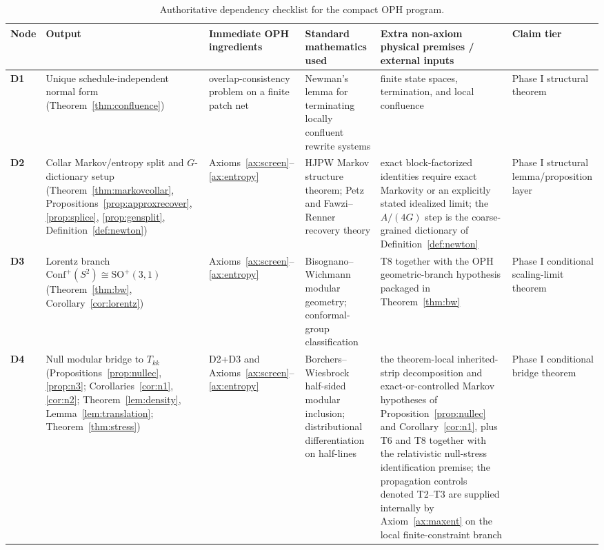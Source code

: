 \documentclass[11pt]{article}
\newcommand{\Conf}{\mathrm{Conf}}
\begin{document}
\begingroup
\scriptsize
\setlength{\tabcolsep}{2pt}
\begin{longtable}{@{}>{\raggedright\arraybackslash}p{}>{\raggedright\arraybackslash}p{}>{\raggedright\arraybackslash}p{}>{\raggedright\arraybackslash}p{}>{\raggedright\arraybackslash}p{}>{\raggedright\arraybackslash}p{}@{}}
\caption{Authoritative dependency checklist for the compact OPH program.}\\
\toprule
Node & Output & Immediate OPH ingredients & Standard mathematics used & Extra non-axiom physical premises / external inputs & Claim tier \\
\midrule
\endhead
\bottomrule
\endfoot
\textbf{D1} & Unique schedule-independent normal form (Theorem~\ref{thm:confluence}) & overlap-consistency problem on a finite patch net & Newman's lemma for terminating locally confluent rewrite systems & finite state spaces, termination, and local confluence & Phase I structural theorem \\
\textbf{D2} & Collar Markov/entropy split and \(G\)-dictionary setup (Theorem~\ref{thm:markovcollar}, Propositions~\ref{prop:approxrecover}, \ref{prop:splice}, \ref{prop:gensplit}, Definition~\ref{def:newton}) & Axioms~\ref{ax:screen}--\ref{ax:entropy} & HJPW Markov structure theorem; Petz and Fawzi--Renner recovery theory & exact block-factorized identities require exact Markovity or an explicitly stated idealized limit; the \(A/(4G)\) step is the coarse-grained dictionary of Definition~\ref{def:newton} & Phase I structural lemma/proposition layer \\
\textbf{D3} & Lorentz branch \(\Conf^+(S^2)\cong \mathrm{SO}^+(3,1)\) (Theorem~\ref{thm:bw}, Corollary~\ref{cor:lorentz}) & Axioms~\ref{ax:screen}--\ref{ax:entropy} & Bisognano--Wichmann modular geometry; conformal-group classification & T8 together with the OPH geometric-branch hypothesis packaged in Theorem~\ref{thm:bw} & Phase I conditional scaling-limit theorem \\
\textbf{D4} & Null modular bridge to \(T_{kk}\) (Propositions~\ref{prop:nullec}, \ref{prop:n3}; Corollaries~\ref{cor:n1}, \ref{cor:n2}; Theorem~\ref{lem:density}, Lemma~\ref{lem:translation}; Theorem~\ref{thm:stress}) & D2+D3 and Axioms~\ref{ax:screen}--\ref{ax:entropy} & Borchers--Wiesbrock half-sided modular inclusion; distributional differentiation on half-lines & the theorem-local inherited-strip decomposition and exact-or-controlled Markov hypotheses of Proposition~\ref{prop:nullec} and Corollary~\ref{cor:n1}, plus T6 and T8 together with the relativistic null-stress identification premise; the propagation controls denoted T2--T3 are supplied internally by Axiom~\ref{ax:maxent} on the local finite-constraint branch & Phase I conditional bridge theorem \\

\end{longtable}
\end{document}
